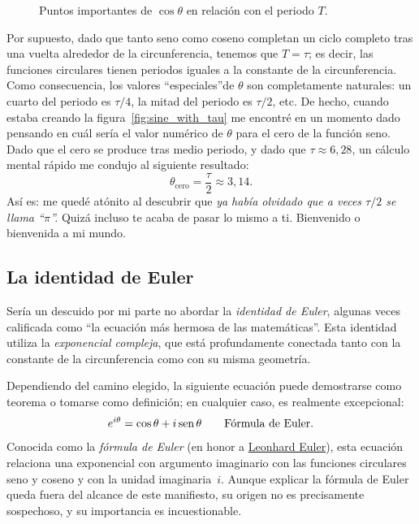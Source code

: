 \begin{figure}
\begin{center}
\end{center}
\caption{Puntos importantes de $\cos\theta$ en relación con el periodo $T$.\label{fig:cosine_with_tau}}
\end{figure}


Por supuesto, dado que tanto seno como coseno completan un ciclo completo tras una vuelta alrededor de la circunferencia, tenemos que $T = \tau$; es decir, las funciones circulares tienen periodos iguales a la constante de la circunferencia. Como consecuencia, los valores ``especiales''de $\theta$ son completamente naturales: un cuarto del periodo es $\tau/4$, la mitad del periodo es $\tau/2$, etc. De hecho, cuando estaba creando la figura~\ref{fig:sine_with_tau} me encontré en un momento dado pensando en cuál sería el valor numérico de $\theta$ para el cero de la función seno. Dado que el cero se produce tras medio periodo, y dado que $\tau \approx 6{,}28$, un cálculo mental rápido me condujo al siguiente resultado:
\[
  \theta_\mathrm{cero} = \frac{\tau}{2} \approx 3{,}14.
\]
Así es: me quedé atónito al descubrir que \emph{ya había olvidado que a veces $\tau/2$ se llama ``$\pi$''.} Quizá incluso te acaba de pasar lo mismo a ti. Bienvenido o bienvenida a mi mundo.



   \subsection{La identidad de Euler} %
   \label{sec:euler_s_identity}

Sería un descuido por mi parte no abordar la \emph{identidad de Euler}, algunas veces calificada como ``la ecuación más hermosa de las matemáticas''. Esta identidad utiliza la \emph{exponencial compleja}, que está profundamente conectada tanto con la constante de la circunferencia como con su misma geometría.

Dependiendo del camino elegido, la siguiente ecuación puede demostrarse como teorema o tomarse como definición; en cualquier caso, es realmente excepcional:
\begin{equation}
\label{eq:eulers_formula}
e^{i\theta} = \cos\theta + i\,\mbox{sen}\,\theta \qquad\mbox{Fórmula de Euler.}
\end{equation}
Conocida como la \emph{fórmula de Euler} (en honor a \href{https://es.wikipedia.org/wiki/Leonhard_Euler}{Leonhard Euler}), esta ecuación relaciona una exponencial con argumento imaginario con las funciones circulares seno y coseno y con la unidad imaginaria~$i$. Aunque explicar la fórmula de Euler queda fuera del alcance de este manifiesto, su origen no es precisamente sospechoso, y su importancia es incuestionable.

